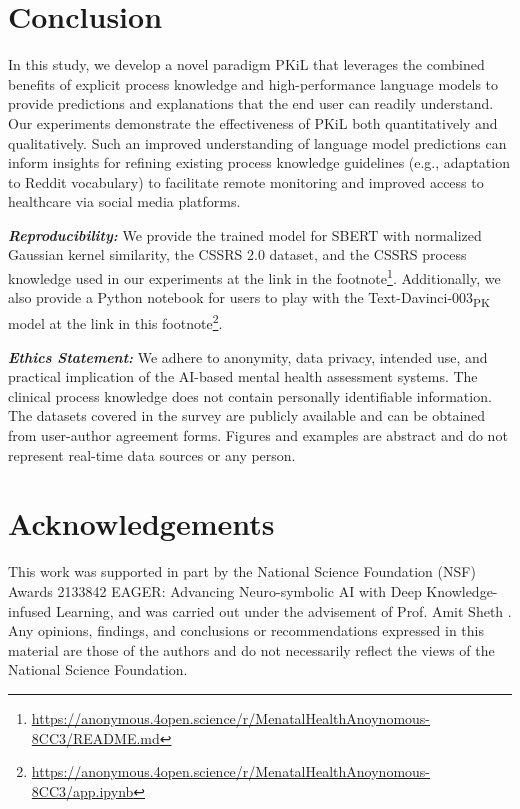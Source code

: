 \documentclass[letterpaper]{article} %
\begin{document}
\section{Conclusion}
In this study, we develop a novel paradigm PKiL that leverages the combined benefits of explicit process knowledge and high-performance language models to provide predictions and explanations that the end user can readily understand. Our experiments demonstrate the effectiveness of PKiL both quantitatively and qualitatively. Such an improved understanding of language model predictions can inform insights for refining existing process knowledge guidelines (e.g., adaptation to Reddit vocabulary) to facilitate remote monitoring and improved access to healthcare via social media platforms.

\textit{\textbf{Reproducibility: }} We provide the trained model for SBERT with normalized Gaussian kernel similarity, the CSSRS 2.0 dataset, and the CSSRS process knowledge used in our experiments at the link in the footnote\footnote{\url{https://anonymous.4open.science/r/MenatalHealthAnoynomous-8CC3/README.md}}. Additionally, we also provide a Python notebook for users to play with the Text-Davinci-003\textsubscript{PK} model at the link in this footnote\footnote{\url{https://anonymous.4open.science/r/MenatalHealthAnoynomous-8CC3/app.ipynb}}.

\textit{\textbf{Ethics Statement: }} We adhere to anonymity, data privacy, intended use, and practical implication of the AI-based mental health assessment systems. The clinical process knowledge does not contain personally identifiable information. The datasets covered in the survey are publicly available and can be obtained from user-author agreement forms. Figures and examples are abstract and do not represent real-time data sources or any person.
\section{Acknowledgements}
This work was supported in part by the National Science Foundation (NSF) Awards 2133842 EAGER: Advancing Neuro-symbolic AI with Deep Knowledge- infused Learning, and was carried out under the advisement of Prof. Amit Sheth \cite{roy2022ksat,roy2022wise,roy2022process,sheth2021knowledge,sheth2022process,sheth2023neurosymbolic}. Any opinions, findings, and conclusions or recommendations expressed in this material are those of the authors and do not necessarily reflect the views of the National Science Foundation.
\end{document}
